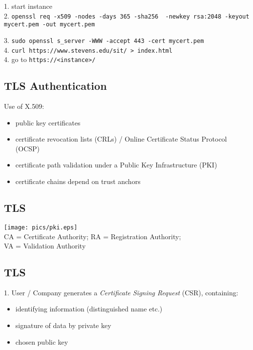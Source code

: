 \documentclass[xga]{xdvislides}
\begin{document}
1. start instance \\

2. {\tt openssl req -x509 -nodes -days 365 -sha256 \
        -newkey rsa:2048 -keyout mycert.pem -out mycert.pem}

3. {\tt sudo openssl s\_server -WWW -accept 443 -cert mycert.pem} \\

4. {\tt curl https://www.stevens.edu/sit/ > index.html} \\

4. go to {\tt https://<instance>/} \\

\subsection{TLS Authentication}
Use of X.509:
\begin{itemize}
	\item public key certificates
	\item certificate revocation lists (CRLs) / Online Certificate Status Protocol (OCSP)
	\item certificate path validation under a Public Key Infrastructure (PKI)
	\item certificate chains depend on trust anchors
\end{itemize}

\subsection{TLS}
\begin{center}
	\texttt{[image: pics/pki.eps]} \\
CA = Certificate Authority;  RA = Registration Authority; \\
VA = Validation Authority
\end{center}

\subsection{TLS}
1. User / Company generates a {\em Certificate Signing Request} (CSR),
containing:

\begin{itemize}
	\item identifying information (distinguished name etc.)
	\item signature of data by private key
	\item chosen public key
\end{itemize}
\end{document}
